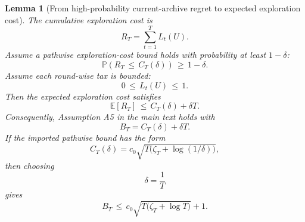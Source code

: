 \documentclass{article} %
\newtheorem{lemma}[theorem]{Lemma}
\begin{document}
\begin{lemma}[From high-probability current-archive regret to expected exploration cost]
\label{lem:16}
The cumulative exploration cost is
\begin{equation}
\label{eq:app-six-RT-def}
R_T
=
\sum_{t=1}^{T}L_t(U).
\end{equation}
Assume a pathwise exploration-cost bound holds with probability at least \(1-\delta\):
\begin{equation}
\label{eq:app-six-hp-event}
\mathbb{P}\!\left(R_T\,\le\, C_T(\delta)\right)\,\ge\, 1-\delta.
\end{equation}
Assume each round-wise tax is bounded:
\begin{equation}
\label{eq:app-six-L-unit-bound}
0\,\le\, L_t(U)\,\le\, 1.
\end{equation}
Then the expected exploration cost satisfies
\begin{equation}
\label{eq:app-six-expected-bridge}
\mathbb{E}[R_T]
\,\le\,
C_T(\delta)+\delta T.
\end{equation}
Consequently, Assumption A5 in the main text holds with
\begin{equation}
\label{eq:app-six-BT-from-CT}
B_T
=
C_T(\delta)+\delta T.
\end{equation}
If the imported pathwise bound has the form
\begin{equation}
\label{eq:app-six-generic-CT}
C_T(\delta)
=
c_0\sqrt{T\bigl(\zeta_T+\log(1/\delta)\bigr)},
\end{equation}
then choosing
\begin{equation}
\label{eq:app-six-delta-choice}
\delta=\frac{1}{T}
\end{equation}
gives
\begin{equation}
\label{eq:app-six-generic-BT}
B_T
\,\le\,
c_0\sqrt{T\bigl(\zeta_T+\log T\bigr)}+1.
\end{equation}
\end{lemma}
\end{document}
